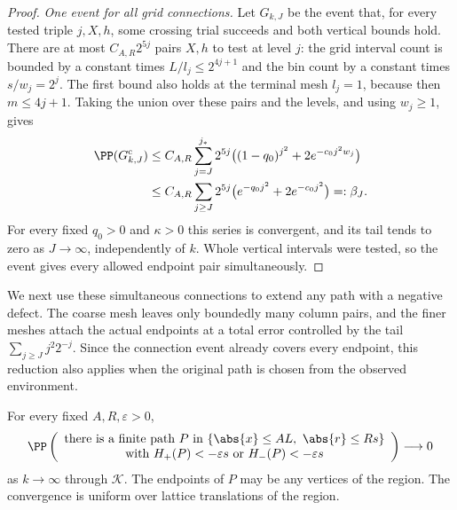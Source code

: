 \begin{proof}
\emph{One event for all grid connections.}
Let $G_{k,J}$ be the event that, for every tested triple $j,X,h$,
some crossing trial succeeds and both vertical bounds hold.
There are at most $C_{A,R}2^{5j}$ pairs $X,h$ to test at level $j$:
the grid interval count is bounded by a constant times
$L/l_j\le2^{4j+1}$ and the bin count by a constant times
$s/w_j=2^j$. The first bound also holds at the terminal mesh
$l_j=1$, because then $m\le4j+1$.
Taking the union over these pairs and the levels, and
using $w_j\ge1$, gives
\[
 \begin{split}
 \PP(G_{k,J}^{\mathrm c})
 &\le C_{A,R}\sum_{j=J}^{j_*}2^{5j}
       \bigl((1-q_0)^{j^2}+2e^{-c_0j^2w_j}\bigr)\\
 &\le C_{A,R}\sum_{j\ge J}2^{5j}
       \bigl(e^{-q_0j^2}+2e^{-c_0j^2}\bigr)=:\beta_J.
 \end{split}
\]
For every fixed $q_0>0$ and $\kappa>0$ this series is convergent,
and its tail tends to zero as $J\to\infty$, independently of $k$.
Whole vertical intervals were tested, so the event gives every
allowed endpoint pair simultaneously.
\end{proof}

We next use these simultaneous connections to extend any path with a
negative defect. The coarse mesh leaves only boundedly many column
pairs, and the finer meshes attach the actual endpoints at a total
error controlled by the tail $\sum_{j\ge J}j^2 2^{-j}$. Since the
connection event already covers every endpoint, this reduction also
applies when the original path is chosen from the observed environment.

\begin{lemma}\label{df:gr:variable-endpoints}
For every fixed $A,R,\varepsilon>0$,
\begin{equation}\label{df:eq:gr-variable-endpoints}
 \PP\left(
 \begin{array}{c}
 \text{there is a finite path }P\text{ in }
 \{\abs{x}\leq AL,\ \abs{r}\leq Rs\}\\
 \text{with }H_+(P)<-\varepsilon s\text{ or }H_-(P)<-\varepsilon s
 \end{array}\right)\longrightarrow0
\end{equation}
as $k\to\infty$ through $\mathcal K$. The endpoints of $P$ may be any
vertices of the region. The convergence is uniform over lattice
translations of the region.
\end{lemma}

